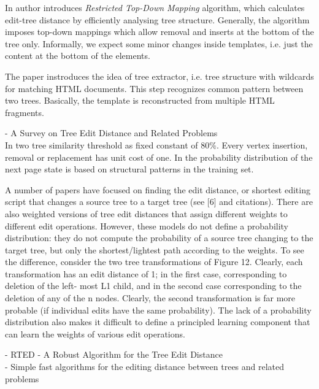 In \cite{de2004a} author introduces \emph{Restricted Top-Down Mapping} algorithm, which calculates edit-tree distance by efficiently analysing tree structure. Generally, the algorithm imposes top-down mappings which allow removal and inserts at the bottom of the tree only. Informally, we expect some minor changes inside templates, i.e. just the content at the bottom of the elements.

The paper \cite{de2004a} instroduces the idea of tree extractor, i.e. tree structure with wildcards for matching HTML documents. This step recognizes common pattern between two trees. Basically, the template is reconstructed from multiple HTML fragments.

- A Survey on Tree Edit Distance and Related Problems\\

In \cite{de2004a} two tree similarity threshold as fixed constant of 80\%. Every vertex insertion, removal or replacement has unit cost of one. In \cite{dalvi2009a} the probability distribution of the next page state is based on structural patterns in the training set.

A number of papers have focused on finding the edit distance, or shortest editing script that changes a source tree to a target tree (see [6] and citations). There are also weighted versions of tree edit distances that assign different weights to different edit operations. However, these models do not define a probability distribution: they do not compute the probability of a source tree changing to the target tree, but only the shortest/lightest path according to the weights. To see the difference, consider the two tree transformations of Figure 12. Clearly, each transformation has an edit distance of 1; in the first case, corresponding to deletion of the left- most L1 child, and in the second case corresponding to the deletion of any of the n nodes. Clearly, the second transformation is far more probable (if individual edits have the same probability). The lack of a probability distribution also makes it difficult to define a principled learning component that can learn the weights of various edit operations.

- RTED - A Robust Algorithm for the Tree Edit Distance\\

- Simple fast algorithms for the editing distance between trees and related problems\\

